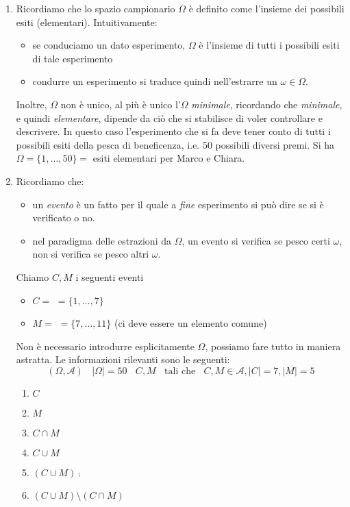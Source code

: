 \begin{enumerate}
	\item Ricordiamo che lo spazio campionario $\Omega $ è definito come l'insieme dei possibili esiti (elementari). Intuitivamente:
	\begin{itemize}
		\item se conduciamo un dato esperimento, $\Omega $ è l'insieme di tutti i possibili esiti di tale esperimento
		\item condurre un esperimento si traduce quindi nell'estrarre un $\omega \in \Omega $.
	\end{itemize}

Inoltre, $\Omega $ non è unico, al più è unico l'$\Omega $ \textit{minimale}, ricordando che \textit{minimale}, e quindi \textit{elementare}, dipende da ciò che si stabilisce di voler controllare e descrivere. In questo caso l'esperimento che si fa deve tener conto di tutti i possibili esiti della pesca di beneficenza, i.e. $50$ possibili diversi premi. Si ha $\Omega =\{1,\dots ,50\} =$ esiti elementari per Marco e Chiara.
	\item Ricordiamo che:
	\begin{itemize}
		\item un \textit{evento} è un fatto per il quale a \textit{fine} esperimento si può dire se si è verificato o no.
		\item nel paradigma delle estrazioni da $\Omega $, un evento si verifica se pesco certi $\omega $, non si verifica se pesco altri $\omega $.
	\end{itemize}

	Chiamo $C,M$ i seguenti eventi
	\begin{itemize}
		\item $C=$  $=\{1,\dots ,7\}$
		\item $M=$  $=\{7,\dots ,11\}$ (ci deve essere un elemento comune)
	\end{itemize}

\begin{oss}
Non è necessario introdurre esplicitamente $\Omega $, possiamo fare tutto in maniera astratta. Le informazioni rilevanti sono le seguenti:
\begin{equation*}
(\Omega ,\mathcal{A}) \ \ \ \ | \Omega | =50\ \ \ \ C,M\ \ \ \ \text{tali che} \ \ \ \ C,M\in \mathcal{A} ,| C| =7,| M| =5
\end{equation*}
\end{oss}
\begin{enumerate}
	\item $C$
	\item $M$
	\item $C\cap M$
	\item $C\cup M$
	\item $(C\cup M)\comp$
	\item $(C\cup M) \setminus (C\cap M)$
\end{enumerate}


\end{enumerate}
